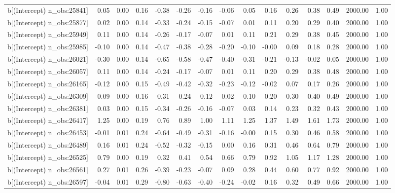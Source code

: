 \begin{table}[ht]
\begin{tabular}{rrrrrrrrrrrrrrr}
  b[(Intercept) n\_obs:25841] & 0.05 & 0.00 & 0.16 & -0.38 & -0.26 & -0.16 & -0.06 & 0.05 & 0.16 & 0.26 & 0.38 & 0.49 & 2000.00 & 1.00 \\ 
  b[(Intercept) n\_obs:25877] & 0.02 & 0.00 & 0.14 & -0.33 & -0.24 & -0.15 & -0.07 & 0.01 & 0.11 & 0.20 & 0.29 & 0.40 & 2000.00 & 1.00 \\ 
  b[(Intercept) n\_obs:25949] & 0.11 & 0.00 & 0.14 & -0.26 & -0.17 & -0.07 & 0.01 & 0.11 & 0.21 & 0.29 & 0.38 & 0.45 & 2000.00 & 1.00 \\ 
  b[(Intercept) n\_obs:25985] & -0.10 & 0.00 & 0.14 & -0.47 & -0.38 & -0.28 & -0.20 & -0.10 & -0.00 & 0.09 & 0.18 & 0.28 & 2000.00 & 1.00 \\ 
  b[(Intercept) n\_obs:26021] & -0.30 & 0.00 & 0.14 & -0.65 & -0.58 & -0.47 & -0.40 & -0.31 & -0.21 & -0.13 & -0.02 & 0.05 & 2000.00 & 1.00 \\ 
  b[(Intercept) n\_obs:26057] & 0.11 & 0.00 & 0.14 & -0.24 & -0.17 & -0.07 & 0.01 & 0.11 & 0.20 & 0.29 & 0.38 & 0.48 & 2000.00 & 1.00 \\ 
  b[(Intercept) n\_obs:26165] & -0.12 & 0.00 & 0.15 & -0.49 & -0.42 & -0.32 & -0.23 & -0.12 & -0.02 & 0.07 & 0.17 & 0.26 & 2000.00 & 1.00 \\ 
  b[(Intercept) n\_obs:26309] & 0.09 & 0.00 & 0.16 & -0.31 & -0.24 & -0.12 & -0.02 & 0.10 & 0.20 & 0.30 & 0.40 & 0.49 & 2000.00 & 1.00 \\ 
  b[(Intercept) n\_obs:26381] & 0.03 & 0.00 & 0.15 & -0.34 & -0.26 & -0.16 & -0.07 & 0.03 & 0.14 & 0.23 & 0.32 & 0.43 & 2000.00 & 1.00 \\ 
  b[(Intercept) n\_obs:26417] & 1.25 & 0.00 & 0.19 & 0.76 & 0.89 & 1.00 & 1.11 & 1.25 & 1.37 & 1.49 & 1.61 & 1.73 & 2000.00 & 1.00 \\ 
  b[(Intercept) n\_obs:26453] & -0.01 & 0.01 & 0.24 & -0.64 & -0.49 & -0.31 & -0.16 & -0.00 & 0.15 & 0.30 & 0.46 & 0.58 & 2000.00 & 1.00 \\ 
  b[(Intercept) n\_obs:26489] & 0.16 & 0.01 & 0.24 & -0.52 & -0.32 & -0.15 & 0.00 & 0.16 & 0.31 & 0.46 & 0.64 & 0.79 & 2000.00 & 1.00 \\ 
  b[(Intercept) n\_obs:26525] & 0.79 & 0.00 & 0.19 & 0.32 & 0.41 & 0.54 & 0.66 & 0.79 & 0.92 & 1.05 & 1.17 & 1.28 & 2000.00 & 1.00 \\ 
  b[(Intercept) n\_obs:26561] & 0.27 & 0.01 & 0.26 & -0.39 & -0.23 & -0.07 & 0.09 & 0.28 & 0.44 & 0.60 & 0.77 & 0.92 & 2000.00 & 1.00 \\ 
  b[(Intercept) n\_obs:26597] & -0.04 & 0.01 & 0.29 & -0.80 & -0.63 & -0.40 & -0.24 & -0.02 & 0.16 & 0.32 & 0.49 & 0.66 & 2000.00 & 1.00 \\ 

\end{tabular}
\end{table}
